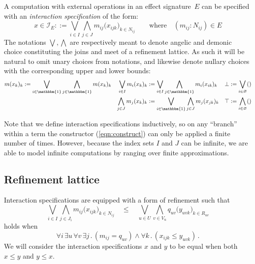 \documentclass[11pt]{article}
\begin{document}
A computation with external operations in an effect signature~$E$
can be specified with an \emph{interaction specification} of the form:
\begin{equation} \label{eqn:construct}
  x \in \mathcal{I}_E ::=
    \bigvee_{i \in I} \bigwedge_{j \in J}
      m_{ij} \big( x_{ijk} \big)_{k \in N_{ij}}
  \qquad \text{where} \quad
  (m_{ij} \mathbin: N_{ij}) \in E
\end{equation}
The notations $\bigvee, \bigwedge$ are respectively meant to denote
angelic and demonic choice
constituting the joins and meet of a refinement lattice.
As such it will be natural to omit unary choices from notations,
and likewise denote nullary choices with the corresponding
upper and lower bounds:
\begin{align*}
  m(x_k)_k &:= \bigvee_{i \in \mathbbm{1}} \bigwedge_{j \in \mathbbm{1}} m(x_k)_k
  &
  \bigvee_{i \in I} m_i(x_k)_k &:=
    \bigvee_{i \in I} \bigwedge_{j \in \mathbbm{1}} m_i(x_{ik})_k
    & \bot &:= \bigvee_{i \in \varnothing} ()
  \\ &&
  \bigwedge_{j \in J} m_j(x_k)_k &:=
    \bigvee_{i \in \mathbbm{1}} \bigwedge_{j \in J} m_j(x_{jk})_k
    & \top &:= \bigwedge_{i \in \varnothing} ()
\end{align*}

Note that we define interaction specifications inductively,
so on any ``branch'' within a term
the constructor (\ref{eqn:construct})
can only be applied a finite number of times.
However,
because the index sets $I$ and $J$ can be infinite,
we are able to model infinite computations
by ranging over finite approximations.



\subsection{Refinement lattice} %

Interaction specifications are equipped with a form of refinement
such that
\[
  \bigvee_{i \in I} \bigwedge_{j \in J_i}
  m_{ij}\big(x_{ijk}\big)_{k \in N_{ij}}
  \quad\le\quad
  \bigvee_{u \in U} \bigwedge_{v \in V_u}
  q_{uv}\big(y_{uvk}\big)_{k \in R_{uv}}
\]
holds when
\[
  \forall i \, \exists u \,
  \forall v \, \exists j \mathbin.
  (m_{ij} = q_{uv}) \wedge
  \forall k \mathbin. (x_{ijk} \le y_{uvk})
  \,.
\]
We will consider the interaction specifications $x$ and $y$
to be equal when both $x \le y$ and $y \le x$.
\end{document}
